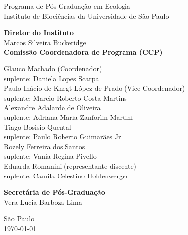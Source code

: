 \begin{center}

{\LARGE Programa de Pós-Graduação em Ecologia \\[1ex]
  Instituto de Biociências da Universidade de São Paulo\\[1ex]
  }
\par
\vspace{0.01\paperheight}
{\Large 
\textbf{Diretor do Instituto} \\[0.5em]
Marcos Silveira Buckeridge\\
\vspace{2em}
\textbf{Comissão Coordenadora de Programa (CCP)} \\[0.5em]
\begin{spacing}{1.2}
  Glauco Machado (Coordenador)\\
  suplente: Daniela Lopes Scarpa \\ [0.75 em]
  Paulo Inácio de Knegt López de Prado (Vice-Coordenador)\\
  suplente: Marcio Roberto Costa Martins \\ [0.75 em]
  Alexandre Adalardo de Oliveira\\
  suplente: Adriana Maria Zanforlin Martini \\ [0.75 em]
  Tiago Bosisio Quental\\
  suplente: Paulo Roberto Guimarães Jr\\ [0.75 em]
  Rozely Ferreira dos Santos\\
  suplente:  Vania Regina Pivello  \\ [0.75 em]
  Eduarda Romanini (representante discente)\\
  suplente:  Camila Celestino Hohlenwerger
\end{spacing}
\vspace{1.25em}
\textbf{Secretária de Pós-Graduação}\\[0.5em]
Vera Lucia Barboza Lima\\
}

\vfill

{\Large São Paulo\\
\today}
\end{center}

\newpage

\tableofcontents

